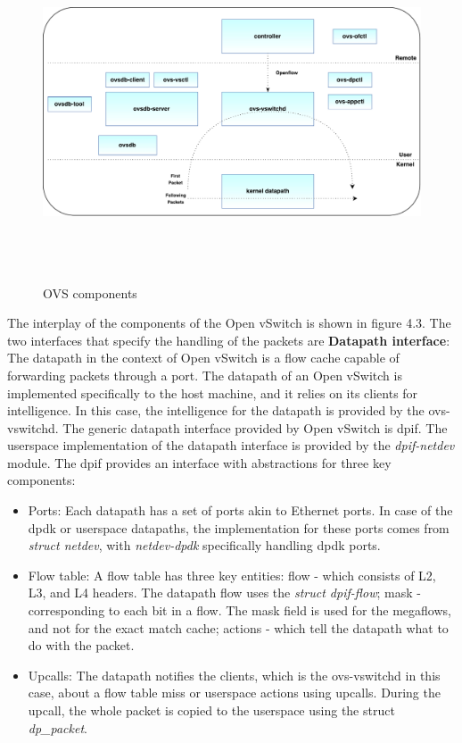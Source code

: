  \begin{figure}[H] 
  \centering   
 \caption{OVS components}
 \includegraphics[height=10cm]{kernaldatapath.pdf}
\end{figure}

The interplay of the components of the Open vSwitch is shown in figure 4.3. The two interfaces that specify the handling of the packets are \newline
\textbf{Datapath interface}: The datapath in the context of Open vSwitch is a flow cache capable of forwarding packets through a port. The datapath of an Open vSwitch is implemented specifically to the host machine, and it relies on its clients for intelligence. In this case, the intelligence for the datapath is provided by the ovs-vswitchd. The generic datapath interface provided by Open vSwitch is dpif. The userspace implementation of the datapath interface is provided by the \textit{dpif-netdev} module. The dpif provides an interface with abstractions for three key components:
\begin{itemize}
 \item Ports: Each datapath has a set of ports akin to Ethernet ports. In case of the dpdk or userspace datapaths, the implementation for these ports comes from \textit{struct netdev}, with \textit{netdev-dpdk} specifically handling dpdk ports.
 \item Flow table: A flow table has three key entities: flow - which consists of L2, L3, and L4 headers. The datapath flow uses the \textit{struct dpif-flow}; mask - corresponding to each bit in a flow. The mask field is used for the megaflows, and not for the exact match cache; actions - which tell the datapath what to do with the packet.
 \item Upcalls: The datapath notifies the clients, which is the ovs-vswitchd in this case, about a flow table miss or userspace actions using upcalls. During the upcall, the whole packet is copied to the userspace using the struct \textit{dp_packet}.
\end{itemize}

